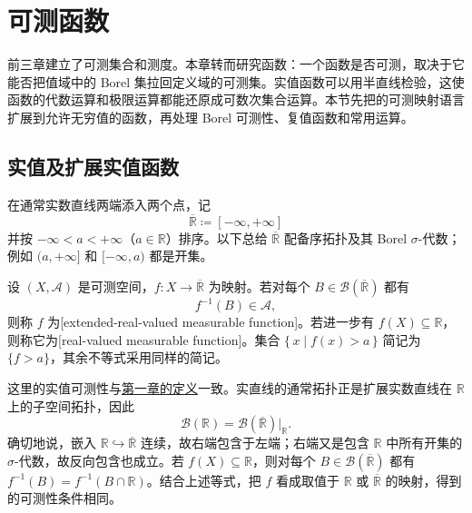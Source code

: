 \section{可测函数}
\label{b1:sec:0401}

前三章建立了可测集合和测度。本章转而研究函数：一个函数是否可测，取决于它能否把值域中的 Borel 集拉回定义域的可测集。实值函数可以用半直线检验，这使函数的代数运算和极限运算都能还原成可数次集合运算。本节先把的可测映射语言扩展到允许无穷值的函数，再处理 Borel 可测性、复值函数和常用运算。

\subsection{实值及扩展实值函数}
\label{b1:subsec:040101}

在通常实数直线两端添入两个点，记
\[
\overline{\mathbb R}\coloneqq[-\infty,+\infty]
\]
并按
\(-\infty<a<+\infty\)（\(a\in\mathbb R\)）排序。以下总给 \(\overline{\mathbb R}\) 配备序拓扑及其 Borel \(\sigma\)-代数；例如 \((a,+\infty]\) 和 \([-\infty,a)\) 都是开集。

\begin{definition}
\label{b1:def:extended-real-measurable}
设 \((X,\mathcal A)\) 是可测空间，\(f:X\rightarrow\overline{\mathbb R}\) 为映射。若对每个 \(B\in\mathcal B(\overline{\mathbb R})\) 都有
\[
f^{-1}(B)\in\mathcal A,
\]
则称 \(f\) 为[extended-real-valued measurable function]。若进一步有 \(f(X)\subseteq\mathbb R\)，则称它为[real-valued measurable function]。集合
\(\{\,x\mid f(x)>a\,\}\) 简记为 \(\{f>a\}\)，其余不等式采用同样的简记。
\end{definition}

这里的实值可测性与\hyperref[b1:subsec:010403]{第一章的定义}一致。实直线的通常拓扑正是扩展实数直线在 \(\mathbb R\) 上的子空间拓扑，因此
\[
\mathcal B(\mathbb R)=\mathcal B(\overline{\mathbb R})|_{\mathbb R}.
\]
确切地说，嵌入 \(\mathbb R\hookrightarrow\overline{\mathbb R}\) 连续，故右端包含于左端；右端又是包含 \(\mathbb R\) 中所有开集的 \(\sigma\)-代数，故反向包含也成立。若 \(f(X)\subseteq\mathbb R\)，则对每个 \(B\in\mathcal B(\overline{\mathbb R})\) 都有 \(f^{-1}(B)=f^{-1}(B\cap\mathbb R)\)。结合上述等式，把 \(f\) 看成取值于 \(\mathbb R\) 或 \(\overline{\mathbb R}\) 的映射，得到的可测性条件相同。

\ProseParagraphBreak

